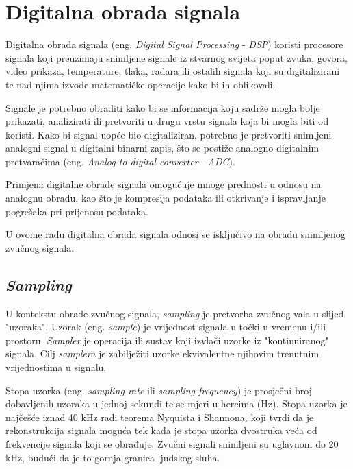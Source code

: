 \documentclass[times, utf8, zavrsni, numeric]{fer}
\begin{document}
%

\chapter{Digitalna obrada signala}
Digitalna obrada signala (eng. \textit{Digital Signal Processing} - \textit{DSP}) koristi procesore signala koji preuzimaju snimljene signale iz stvarnog svijeta poput zvuka, govora, video prikaza, temperature, tlaka, radara ili ostalih signala koji su digitalizirani te nad njima izvode matematičke operacije kako bi ih oblikovali.

Signale je potrebno obraditi kako bi se informacija koju sadrže mogla bolje prikazati, analizirati ili pretvoriti u drugu vrstu signala koja bi mogla biti od koristi. Kako bi signal uopće bio digitaliziran, potrebno je pretvoriti snimljeni analogni signal u digitalni binarni zapis, što se postiže analogno-digitalnim pretvaračima (eng. \textit{Analog-to-digital converter} - \textit{ADC}).

Primjena digitalne obrade signala omogućuje mnoge prednosti u odnosu na analognu obradu, kao što je kompresija podataka ili otkrivanje i ispravljanje pogrešaka pri prijenosu podataka.\cite{broesch2008digital}

U ovome radu digitalna obrada signala odnosi se isključivo na obradu snimljenog zvučnog signala.

\section{\textit{Sampling}}
U kontekstu obrade zvučnog signala, \textit{sampling} je pretvorba zvučnog vala u slijed "uzoraka". Uzorak (eng. \textit{sample}) je vrijednost signala u točki u vremenu i/ili prostoru.
\textit{Sampler} je operacija ili sustav koji izvlači uzorke iz "kontinuiranog" signala. Cilj \textit{samplera} je zabilježiti uzorke ekvivalentne njihovim trenutnim vrijednostima u signalu. 

Stopa uzorka (eng. \textit{sampling rate} ili \textit{sampling frequency}) je prosječni broj dobavljenih uzoraka u jednoj sekundi te se mjeri u hercima (Hz). Stopa uzorka je najčešće iznad 40 kHz radi teorema Nyquista i Shannona, koji tvrdi da je rekonstrukcija signala moguća tek kada je stopa uzorka dvostruka veća od frekvencije signala koji se obrađuje.\cite{candes2008introduction} Zvučni signali snimljeni su uglavnom do 20 kHz, budući da je to gornja granica ljudskog sluha.
\end{document}
